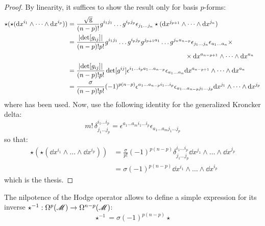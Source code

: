 \begin{proofbox}
  \begin{proof}
    By linearity, it suffices to show the result only for basis $ p $-forms:
    \begin{equation*}
      \begin{split}
        \star (\star (\mathrm{d} x^{i_1} \wedge \dots \wedge \mathrm{d} x^{i_p}))
        & = \frac{\sqrt{\mathrm{g}}}{(n-p)!} g^{i_1 j_1} \dots g^{i_p j_p} \epsilon_{j_1 \dots j_n} \star (\mathrm{d} x^{j_{p+1}} \wedge \dots \wedge \mathrm{d} x^{j_n}) \\
        & = \frac{\left\lvert\det [g_{ij}]\right\rvert}{(n-p)! p!} g^{i_1 j_1} \dots g^{i_p j_p} g^{j_{p+1} a_1} \dots g^{j_n a_{n-p}} \epsilon_{j_1 \dots j_n} \epsilon_{a_1 \dots a_n} \times \\
        & \qquad \qquad \qquad \qquad \qquad \qquad \qquad \qquad \qquad \times \mathrm{d} x^{a_{n-p+1}} \wedge \dots \wedge \mathrm{d} x^{a_n} \\
        & = \frac{\left\lvert\det [g_{ij}]\right\rvert}{(n-p)! p!} \det [g^{ij}] \epsilon^{i_1 \dots i_p a_1 \dots a_{n-p}} \epsilon_{a_1 \dots a_n} \mathrm{d} x^{a_{n-p+1}} \wedge \dots \wedge \mathrm{d} x^{a_n} \\
        & = \frac{\sigma}{(n-p)! p!} (-1)^{p(n-p)} \epsilon^{a_1 \dots a_{n-p} i_1 \dots i_p} \epsilon_{a_1 \dots a_{n-p} j_1 \dots j_p} \mathrm{d} x^{j_1} \wedge \dots \wedge \mathrm{d} x^{j_p}
      \end{split}
    \end{equation*}
    where  has been used. Now, use the following identity for the generalized Kroncker delta:
    \begin{equation}
      m! \, \delta^{i_1 \dots i_p}_{j_1 \dots j_p} = \epsilon^{a_1 \dots a_m i_1 \dots i_p} \epsilon_{a_1 \dots a_m j_1 \dots j_p}
    \end{equation}
    so that:
    \begin{equation*}
      \begin{split}
        \star (\star (\dd x^{i_1} \wedge \dots \wedge \dd x^{i_p}))
        & = \frac{\sigma}{p!} (-1)^{p(n-p)} \delta^{i_1 \dots i_p}_{j_1 \dots j_p} \dd x^{j_1} \wedge \dots \wedge \dd x^{j_p} \\
        & = \sigma (-1)^{p(n-p)} \dd x^{i_1} \wedge \dots \wedge \dd x^{i_p}
      \end{split}
    \end{equation*}
    which is the thesis.
  \end{proof}
\end{proofbox}

The nilpotence of the Hodge operator allows to define a simple expression for its inverse $ \star^{-1} : \Omega^{p}(\mathscr{M}) \rightarrow \Omega^{n-p}(\mathscr{M}) $:
\begin{equation}
  \star^{-1} = \sigma (-1)^{p(n-p)} \star
\end{equation}

